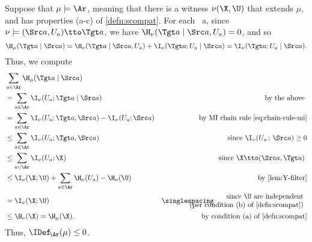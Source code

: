 \begin{subappendices}
\begin{lproof}
        \label{proof:sdef-le0}
    Suppose that $\mu \models \Ar$, meaning that there is a witness $\nu(\X, \U)$ that extends $\mu$, and has properties (a-c) of \cref{defn:scompat}. 
    For each \arc\ a, since
    $\nu \models (\Src a, U_a) \tto \Tgt a$, 
    we have
    $\H_\nu(\Tgt a \mid \Src a, U_a) = 0$, and so
    \[
    \H_\mu(\Tgt a \mid \Src a) = \H_\nu(\Tgt a \mid \Src a, U_a) + \I_\nu(\Tgt a ; U_a \mid \Src a) = \I_\nu(\Tgt a; U_a \mid \Src a).
    \]
    Thus, we compute    
    \begin{align*}
        &\sum_{a \in \Ar} \H_\mu(\Tgt a \mid \Src a)\\
        &= \sum_{a \in \Ar} \I_\nu(U_a ; \Tgt a \mid \Src a) 
            & \text { by the above } \\
        &= \sum_{a \in \Ar} \I_\nu(U_a ; \Tgt a, \Src a) - \I_\nu(U_a ; \Src a)
            & \text{ by MI chain rule \eqref{eq:chain-rule-mi}} \\
        &\le \sum_{a \in \Ar} \I_\nu(U_a ; \Tgt a, \Src a) 
            & \text{ since $\I_\nu(U_a\,;\,\Src a) \ge 0$} 
        \\
        &\le \sum_{a \in \Ar} \I_\nu(U_a ; \X) 
            &\text{ since $\X \tto (\Src a, \Tgt a)$ }
        \\
        &\le \I_\nu(\X ; \U) + \sum_{a \in \Ar} \H_\nu( U_a ) - \H_\nu(\U)
            & \text{ by \cref{lem:Y-filter}}
        \\
        &= \I_\nu(\X ; \U) 
            &
            {\singlespacing\hspace{-1.5cm}
            \begin{array}{r}\text{ since $\U$ are independent}\\
                \text{ (per condition (b) of \cref{defn:scompat})} \end{array}
            }
        \\
        &\le \H_\nu(\X) = \H_\mu(\X).
            &
            \hspace{-1.5cm}
            \text{by condition (a) of \cref{defn:scompat}}
    \end{align*}
    Thus, $\IDef_{\!\Ar}(\mu) \le 0$. \qedhere
\end{lproof}



\end{subappendices}
